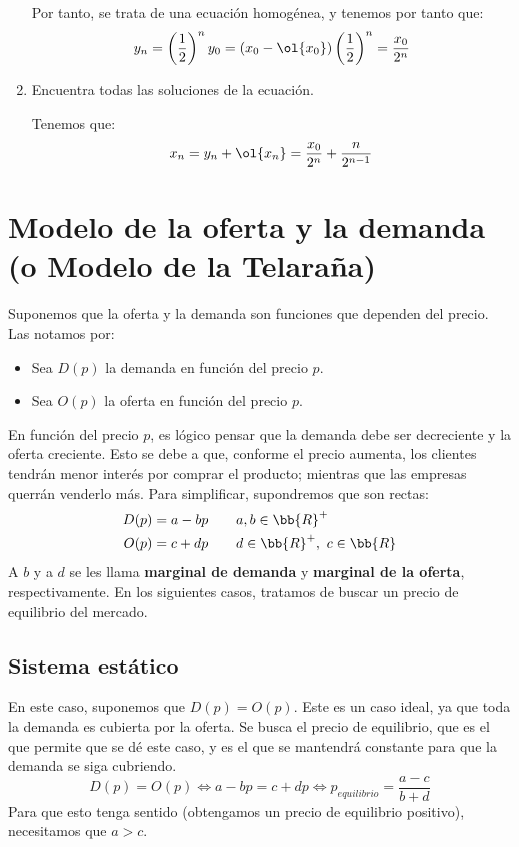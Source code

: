 \begin{ejercicio*}
\begin{enumerate}
        Por tanto, se trata de una ecuación homogénea, y tenemos por tanto que:
        \begin{equation*}
            y_n = \left(\frac{1}{2}\right)^ny_0
            = (x_0 - \ol{x_0})\left(\frac{1}{2}\right)^n
            = \frac{x_0}{2^n}
        \end{equation*}
        
        \item Encuentra todas las soluciones de la ecuación.

        Tenemos que:
        \begin{equation*}
            x_n = y_n + \ol{x_n}
            = \frac{x_0}{2^n} + \frac{n}{2^{n-1}}
        \end{equation*}
    \end{enumerate}
\end{ejercicio*}

\section{Modelo de la oferta y la demanda (o Modelo de la Telaraña)}
Suponemos que la oferta y la demanda son funciones que dependen del precio. Las notamos por:
\begin{itemize}
    \item Sea $D(p)$ la demanda en función del precio $p$.
    \item Sea $O(p)$ la oferta en función del precio $p$.
\end{itemize}

En función del precio $p$, es lógico pensar que la demanda debe ser decreciente y la oferta creciente. Esto se debe a que, conforme el precio aumenta, los clientes tendrán menor interés por comprar el producto; mientras que las empresas querrán venderlo más. Para simplificar, supondremos que son rectas:
\begin{align*}
    D(p) &= a-bp \qquad a,b \in \bb{R}^+\\
    O(p) &= c + dp \qquad d \in \bb{R}^+,~c\in \bb{R}
\end{align*}
A $b$ y a $d$ se les llama \textbf{marginal de demanda} y \textbf{marginal de la oferta}, respectivamente.
En los siguientes casos, tratamos de buscar un precio de equilibrio del mercado.

\subsection{Sistema estático}
En este caso, suponemos que $D(p) = O(p)$. Este es un caso ideal, ya que toda la demanda es cubierta por la oferta. Se busca el precio de equilibrio, que es el que permite que se dé este caso, y es el que se mantendrá constante para que la demanda se siga cubriendo. 
\begin{equation*}
    D(p)=O(p) \Longleftrightarrow
    a - bp = c+dp
    \Longleftrightarrow p_{equilibrio} = \dfrac{a-c}{b+d}
\end{equation*}
Para que esto tenga sentido (obtengamos un precio de equilibrio positivo), necesitamos que $a > c$.

